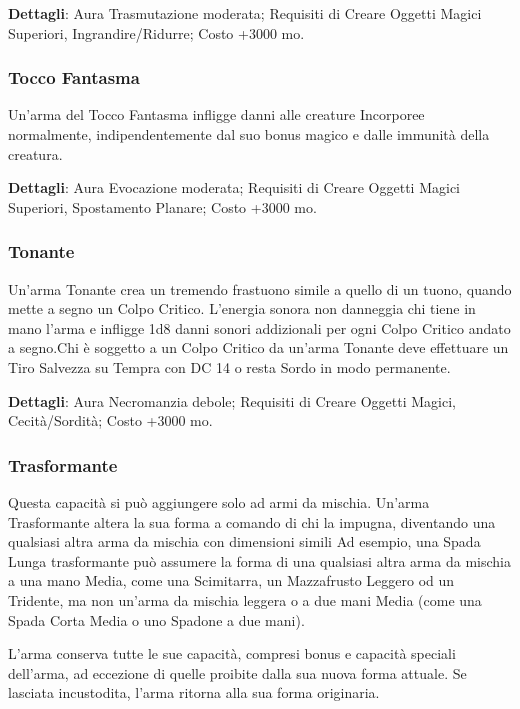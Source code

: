 \begin{multicols}{2}
	\textbf{Dettagli}: Aura Trasmutazione moderata; Requisiti di Creare Oggetti Magici Superiori, Ingrandire/Ridurre; Costo +3000 mo.

	\subsubsection*{Tocco Fantasma}

	Un'arma del Tocco Fantasma infligge danni alle creature Incorporee normalmente, indipendentemente dal suo bonus magico e dalle immunità della creatura.

	\textbf{Dettagli}: Aura Evocazione moderata; Requisiti di Creare Oggetti Magici Superiori, Spostamento Planare; Costo +3000 mo.

	\subsubsection*{Tonante}

	Un'arma Tonante crea un tremendo frastuono simile a quello di un tuono, quando mette a segno un Colpo Critico. L'energia sonora non danneggia chi tiene in mano l'arma e infligge 1d8 danni sonori addizionali per ogni Colpo Critico andato a segno.Chi è soggetto a un Colpo Critico da un'arma Tonante deve effettuare un Tiro Salvezza su Tempra con DC 14 o resta Sordo in modo permanente.

	\textbf{Dettagli}: Aura Necromanzia debole; Requisiti di Creare Oggetti Magici, Cecità/Sordità; Costo +3000 mo.

	\subsubsection*{Trasformante}

	Questa capacità si può aggiungere solo ad armi da mischia. Un'arma Trasformante altera la sua forma a comando di chi la impugna, diventando una qualsiasi altra arma da mischia con dimensioni simili Ad esempio, una Spada Lunga trasformante può assumere la forma di una qualsiasi altra arma da mischia a una mano Media, come una Scimitarra, un Mazzafrusto Leggero od un Tridente, ma non un'arma da mischia leggera o a due mani Media (come una Spada Corta Media o uno Spadone a due mani).

	L'arma conserva tutte le sue capacità, compresi bonus e capacità speciali dell'arma, ad eccezione di quelle proibite dalla sua nuova forma attuale. Se lasciata incustodita, l'arma ritorna alla sua forma originaria.


\end{multicols}
